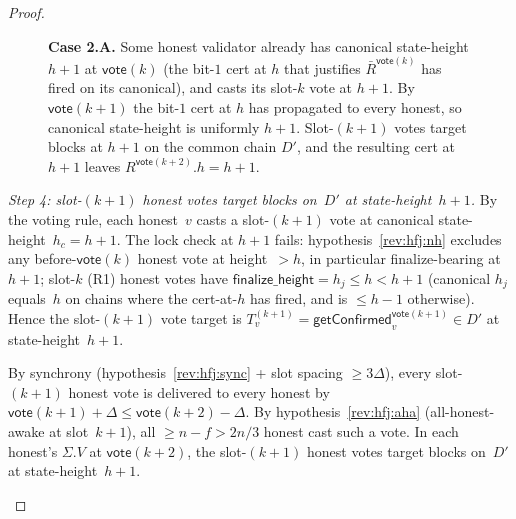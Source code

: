 \documentclass{article}
\newcommand{\finalizeHeight}{\mathsf{finalize\_height}}
\newcommand{\vote}{\mathsf{vote}}
\newcommand{\comm}[1]{\bar{#1}}
\newcommand{\getConfirmed}{\textsf{getConfirmed}\xspace}
\theoremstyle{plain}
\theoremstyle{definition}
\theoremstyle{remark}
\newcommand{\AHA}{all-honest-awake\xspace}
\begin{document}
\begin{proof}
\begin{description}
\begin{description}
\begin{figure}[H]
\caption{\label{rev:fig:hfj-case2a}\textbf{Case 2.A.} Some honest validator already has canonical state-height $h+1$ at $\vote(k)$ (the bit-$1$ cert at $h$ that justifies $\comm{R}^{\vote(k)}$ has fired on its canonical), and casts its slot-$k$ vote at $h+1$. By $\vote(k+1)$ the bit-$1$ cert at $h$ has propagated to every honest, so canonical state-height is uniformly $h+1$. Slot-$(k+1)$ votes target blocks at $h+1$ on the common chain $D'$, and the resulting cert at $h+1$ leaves $R^{\vote(k+2)}.h = h+1$.}
\end{figure}

\emph{Step 4: slot-$(k+1)$ honest votes target blocks on~$D'$ at state-height~$h+1$.}
By the voting rule, each honest~$v$ casts a slot-$(k+1)$ vote at canonical state-height~$h_c = h+1$. The lock check at $h+1$ fails: hypothesis~\ref{rev:hfj:nh} excludes any before-$\vote(k)$ honest vote at height~$>h$, in particular finalize-bearing at $h+1$; slot-$k$ (R1) honest votes have $\finalizeHeight = h_j \leq h < h+1$ (canonical $h_j$ equals~$h$ on chains where the cert-at-$h$ has fired, and is $\leq h-1$ otherwise). Hence the slot-$(k+1)$ vote target is $T_v^{(k+1)} = \getConfirmed_v^{\vote(k+1)} \in D'$ at state-height~$h+1$.

By synchrony (hypothesis~\ref{rev:hfj:sync} + slot spacing $\geq 3\Delta$), every slot-$(k+1)$ honest vote is delivered to every honest by $\vote(k+1) + \Delta \leq \vote(k+2) - \Delta$. By hypothesis~\ref{rev:hfj:aha} (\AHA at slot~$k+1$), all $\geq n - f > 2n/3$ honest cast such a vote. In each honest's $\Sigma.V$ at $\vote(k+2)$, the slot-$(k+1)$ honest votes target blocks on~$D'$ at state-height~$h+1$.


\end{description}
\end{description}
\end{proof}
\end{document}

